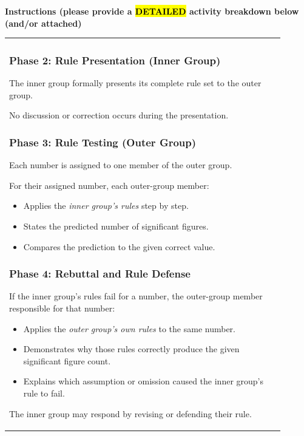 \documentclass{article}
\begin{document}
\newpage
\noindent
{\large \textbf{Instructions (please provide a \hl{DETAILED} activity breakdown below (and/or attached)}} \\[0.2em]

\begin{tabular}{|p{0.9\linewidth}|}
\hline
\subsubsection*{Phase 2: Rule Presentation (Inner Group)}

The inner group formally presents its complete rule set to the outer group.

No discussion or correction occurs during the presentation.

\subsubsection*{Phase 3: Rule Testing (Outer Group)}

Each number is assigned to one member of the outer group.

For their assigned number, each outer-group member:
\begin{itemize}
    \item Applies the \emph{inner group’s rules} step by step.
    \item States the predicted number of significant figures.
    \item Compares the prediction to the given correct value.
\end{itemize}

\subsubsection*{Phase 4: Rebuttal and Rule Defense}

If the inner group’s rules fail for a number, the outer-group member responsible for that number:
\begin{itemize}
    \item Applies the \emph{outer group’s own rules} to the same number.
    \item Demonstrates why those rules correctly produce the given significant figure count.
    \item Explains which assumption or omission caused the inner group’s rule to fail.
\end{itemize}

The inner group may respond by revising or defending their rule.


\end{tabular}
\end{document}
